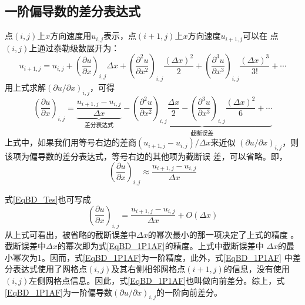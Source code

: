 \subsection{一阶偏导数的差分表达式}
点$(i,j)$上$x$方向速度用$u_{i,j}$表示，点$(i+1,j)$上$x$方向速度$u_{i+1,j}$可以在
点$(i,j)$上通过泰勒级数展开为：
\begin{equation}
  u_{i+1,j}
  =
  u_{i,j} + 
  \left(
    \frac{\partial u}{\partial x}
  \right)_{i,j}
  \Delta x
  +
  \left(
    \frac{\partial^{2} u}{\partial x^{2}}
  \right)_{i,j}
  \frac{(\Delta x)^{2}}{2}
  +
  \left(
    \frac{\partial^{3} u}{\partial x^{3}}
  \right)_{i,j}
  \frac{(\Delta x)^{3}}{3!}
  +
  \cdots
  \label{EqBD_Tsp_F}
\end{equation}
用上式求解$(\partial u/\partial x)_{i,j}$，可得
\begin{equation}
  \left(
    \frac{\partial u}{\partial x}
  \right)_{i,j}
  =
  \underbrace{
  \frac{u_{i+1,j}-u_{i,j}}{\Delta x}
}_{\mbox{差分表达式}}
  -
  \underbrace{
  \left(
    \frac{\partial^{2} u}{\partial x^{2}}
  \right)_{i,j}
  \frac{\Delta x}{2}
  -
  \left(
    \frac{\partial^{3} u}{\partial x^{3}}
  \right)_{i,j}
  \frac{(\Delta x)^{2}}{6}
  +
  \cdots
}_{\mbox{截断误差}}
\label{EqBD_Tes}
\end{equation}
上式中，如果我们用等号右边的差商$(u_{i+1,j}-u_{i,j})/\Delta x$来近似
$(\partial u/\partial x)_{i,j}$，则该项为偏导数的差分表达式，等号右边的其他项为截断误
差，可以省略。即，
\begin{equation}
  \left(
    \frac{\partial u}{\partial x}
  \right)_{i,j}
  \approx
  \frac{u_{i+1,j}-u_{i,j}}{\Delta x}
\end{equation}

式\eqref{EqBD_Tes}也可写成
\begin{equation}
  \left(
    \frac{\partial u}{\partial x}
  \right)_{i,j}
  =
  \frac{u_{i+1,j}-u_{i,j}}{\Delta x}
  +
  O(\Delta x)
  \label{EqBD_1P1AF}
\end{equation}
从上式可看出，被省略的截断误差中$\Delta x$的幂次最小的那一项决定了上式的精度
。截断误差中$\Delta x$的幂次即为式\eqref{EqBD_1P1AF}的精度。上式中截断误差中
$\Delta x$的最小幂次为1。因而，式\eqref{EqBD_1P1AF}为一阶精度，此外，式\eqref{EqBD_1P1AF}
中差分表达式使用了网格点$(i,j)$及其右侧相邻网格点$(i+1,j)$的信息，没有使用
$(i,j)$左侧网格点信息。因此，式\eqref{EqBD_1P1AF}也叫做向前差分。综上，式
\eqref{EqBD_1P1AF}为一阶偏导数$(\partial u/\partial x)_{i,j}$的一阶向前差分。

